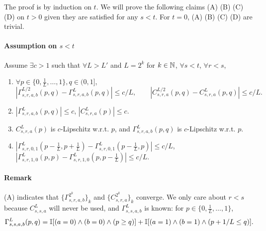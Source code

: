 \documentclass{article}
\theoremstyle{plain}
\theoremstyle{definition}
\begin{document}
The proof is by induction on $t$. We will prove the following claims (A) (B) (C) (D) on $t > 0$ given they are satisfied for any $s<t$. For $t=0$, (A) (B) (C) (D) are trivial. 
\paragraph{Assumption on $s<t$} Assume $\exists c>1$ such that $\forall L > L'$ and $L=2^k$ for $k\in \mathbb{N}$, $\forall s < t$, $\forall r < s$,
\begin{enumerate}[label=(\Alph*)]
    \item $\forall p \in \{0, \frac1L, \ldots, 1\}, q\in (0,1]$,
    \[|\Gamma^{L/2}_{s,r,a,b}(p,q) - \Gamma^L_{s,r,a,b}(p,q)| \leq c/L,\qquad |C^{L/2}_{s,r,a}(p,q) - C^{L}_{s,r,a}(p,q)|\leq c / L.\]
    \item $|\Gamma^{L}_{s,r,a,b}(p,q)|\leq c$, $|C^L_{s,r,a}(p)|\leq c$.
    \item $C^L_{s, r, a}(p)$ is $c$-Lipschitz w.r.t. $p$, and $\Gamma^L_{s,r,a,b}(p,q)$ is $c$-Lipschitz w.r.t. $p$. 
    \item $|\Gamma^L_{s,r,0,1}(p-\frac1L,p+\frac1L)-\Gamma^L_{s,r,0,1}(p-\frac1L,p)|\leq c/L$,
    $|\Gamma^L_{s,r,1,0}(p,p) - \Gamma^L_{s,r,1,0}(p,p-\frac1L)|\leq c/L$.
\end{enumerate}

\paragraph{Remark}
    (A) indicates that $\{\Gamma^{2^k}_{s,r,a,b}\}_k$ and $\{C^{2^k}_{s,r,a}\}_k$ converge.
    We only care about $r<s$ because $C^L_{s,s,a}$ will never be used, and $\Gamma^L_{s,s,a,b}$ is known: for $p\in \{0, \frac1L, \ldots, 1\}$, \[\Gamma^L_{s,s,a,b}(p,q) = \mathbb{I}[(a=0)\wedge (b=0)\wedge (p\geq q)]+ \mathbb{I}[(a=1)\wedge (b=1)\wedge (p+1/L\leq q)].\]
    

    
\end{document}
